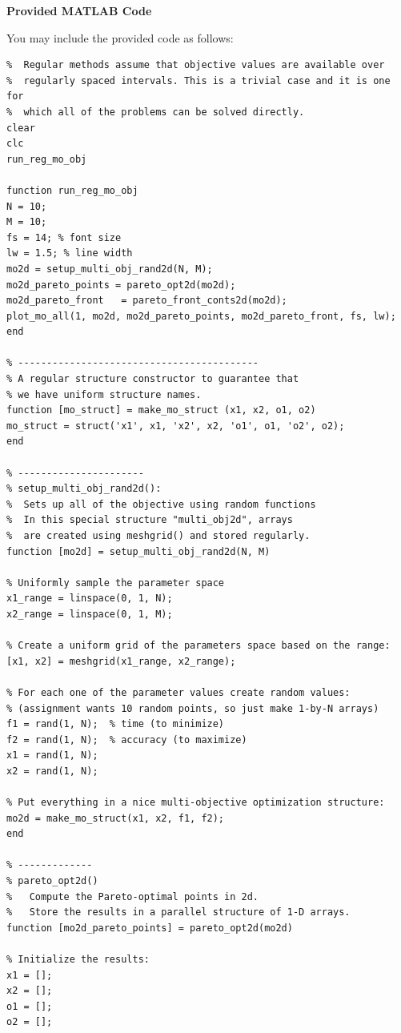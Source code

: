 \documentclass[11pt]{article}
\begin{document}
	\newpage
	
	\vspace{1.5em}
	\noindent\textbf{Provided MATLAB Code}
	
	\noindent You may include the provided code as follows:
	\begin{lstlisting}[style=matlabstyle]
% Regular multi-objective optimization methods:
%  Regular methods assume that objective values are available over
%  regularly spaced intervals. This is a trivial case and it is one for
%  which all of the problems can be solved directly.
clear
clc
run_reg_mo_obj

function run_reg_mo_obj
N = 10;
M = 10;
fs = 14; % font size
lw = 1.5; % line width
mo2d = setup_multi_obj_rand2d(N, M);
mo2d_pareto_points = pareto_opt2d(mo2d);
mo2d_pareto_front   = pareto_front_conts2d(mo2d);
plot_mo_all(1, mo2d, mo2d_pareto_points, mo2d_pareto_front, fs, lw);
end

% ------------------------------------------
% A regular structure constructor to guarantee that
% we have uniform structure names.
function [mo_struct] = make_mo_struct (x1, x2, o1, o2)
mo_struct = struct('x1', x1, 'x2', x2, 'o1', o1, 'o2', o2);
end

% ----------------------
% setup_multi_obj_rand2d():
%  Sets up all of the objective using random functions
%  In this special structure "multi_obj2d", arrays
%  are created using meshgrid() and stored regularly.
function [mo2d] = setup_multi_obj_rand2d(N, M)

% Uniformly sample the parameter space
x1_range = linspace(0, 1, N);
x2_range = linspace(0, 1, M);

% Create a uniform grid of the parameters space based on the range:
[x1, x2] = meshgrid(x1_range, x2_range);

% For each one of the parameter values create random values:
% (assignment wants 10 random points, so just make 1-by-N arrays)
f1 = rand(1, N);  % time (to minimize)
f2 = rand(1, N);  % accuracy (to maximize)
x1 = rand(1, N);
x2 = rand(1, N);

% Put everything in a nice multi-objective optimization structure: 
mo2d = make_mo_struct(x1, x2, f1, f2);
end

% -------------
% pareto_opt2d()
%   Compute the Pareto-optimal points in 2d.
%   Store the results in a parallel structure of 1-D arrays.
function [mo2d_pareto_points] = pareto_opt2d(mo2d)

% Initialize the results:
x1 = [];
x2 = [];
o1 = [];
o2 = [];


\end{lstlisting}
\end{document}
